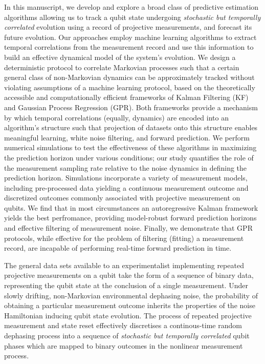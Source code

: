 \documentclass[pra, reprint]{revtex4-1}
\begin{document}
In this manuscript, we develop and explore a broad class of predictive estimation algorithms allowing us to track a qubit state undergoing \emph{stochastic but temporally correlated} evolution using a record of projective measurements, and forecast its future evolution. Our approaches employ machine learning algorithms to extract temporal correlations from the measurement record and use this information to build an effective dynamical model of the system's evolution.  We design a deterministic protocol to correlate Markovian processes such that a certain general class of non-Markovian dynamics can be approximately tracked without violating assumptions of a machine learning protocol, based on the theoretically accessible and computationally efficient frameworks of Kalman Filtering (KF) and Gaussian Process Regression (GPR).  Both frameworks provide a mechanism by which temporal correlations (equally, dynamics) are encoded into an algorithm's structure such that projection of datasets onto this structure enables meaningful learning, white noise filtering, and forward prediction.  We perform numerical simulations to test the effectiveness of these algorithms in maximizing the prediction horizon under various conditions; our study quantifies the role of the measurement sampling rate relative to the noise dynamics in defining the prediction horizon.  Simulations incorporate a variety of measurement models, including pre-processed data yielding a continuous measurement outcome and discretized outcomes commonly associated with projective measurement on qubits.   We find that in most circumstances an autoregressive Kalman framework yields the best perfromance, providing model-robust forward prediction horizons and effective filtering of measurement noise.  Finally, we demonstrate that GPR protocols, while effective for the problem of filtering (fitting) a measurement record, are incapable of performing real-time forward prediction in time.  

The general data sets available to an experimentalist implementing repeated projective measurements on a qubit take the form of a sequence of binary data, representing the qubit state at the conclusion of a single measurement.  Under slowly drifting, non-Markovian environmental dephasing noise, the probability of obtaining a particular measurement outcome inherits the properties of the noise Hamiltonian inducing qubit state evolution. The process of repeated projective measurement and state reset effectively discretises a continous-time random dephasing process into a sequence of \textit{stochastic but temporally correlated} qubit phases which are mapped to binary outcomes in the nonlinear measurement process.
\end{document}
